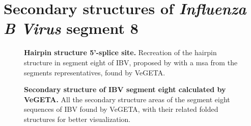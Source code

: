     \section{Secondary structures of \textit{Influenza B Virus} segment 8}
    
    \begin{figure}[!htb]
        \centering
        \caption[Hairpin structure 5'-splice site]{\textbf{Hairpin structure 5'-splice site.} Recreation of the hairpin structure in segment eight of \gls{IBV}, proposed by \textcite{structure_BC} with a \gls{msa} from the segments representatives, found by VeGETA.}
        \label{fig:3.11}
    \end{figure}
    
    \begin{figure}[!htb]
        \centering
        \caption[Secondary structure of \gls{IBV} segment seven calculated by VeGETA]{\textbf{Secondary structure of \gls{IBV} segment eight calculated by VeGETA.} All the secondary structure areas of the segment eight sequences of \gls{IBV} found by VeGETA, with their related folded structures for better visualization.}
        \label{fig:3.12}
    \end{figure}
    
